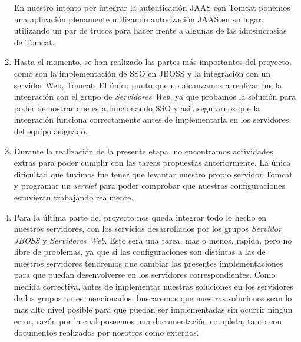 \begin{enumerate}
		En nuestro intento por integrar la autenticación JAAS con Tomcat ponemos una aplicación plenamente utilizando autorización
		JAAS en su lugar, utilizando un par de trucos para hacer frente a algunas de las idiosincrasias de Tomcat. 

	\item Hasta el momento, se han realizado las partes más importantes del proyecto,
		como son la implementación de SSO en JBOSS y la integración con un servidor Web, Tomcat.
		El único punto que no alcanzamos a realizar fue la integración con el grupo de \emph{Servidores Web},
		ya que probamos la solución para poder demostrar que esta funcionando SSO y así asegurarnos que la integración
		funciona correctamente antes de implementarla en los servidores del equipo asignado.

	\item Durante la realización de la presente etapa, no encontramos actividades extras para poder cumplir con las tareas
		propuestas anteriormente. La única dificultad que tuvimos fue tener que levantar nuestro propio servidor Tomcat
		y programar un \emph{servlet} para poder comprobar que nuestras configuraciones estuvieran trabajando realmente.

	\item Para la última parte del proyecto nos queda integrar todo lo hecho en nuestros servidores, con los servicios
		desarrollados por los grupos \emph{Servidor JBOSS} y \emph{Servidores Web}. Esto será una tarea, mas o menos, rápida,
		pero no libre de problemas, ya que si las configuraciones son distintas a las de nuestros servidores tendremos que cambiar
		las presentes implementaciones para que puedan desenvolverse en los servidores correspondientes.
		Como medida correctiva, antes de implementar nuestras soluciones en los servidores de los grupos antes mencionados,
		buscaremos que nuestras soluciones sean lo mas alto nivel posible para que puedan ser implementadas sin ocurrir ningún error,
		razón por la cual poseemos una documentación completa, tanto con documentos realizados por nosotros como externos.

\end{enumerate}
